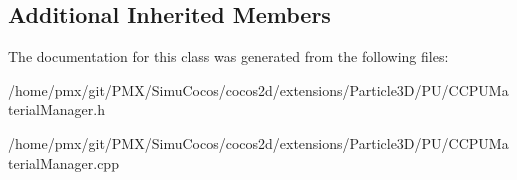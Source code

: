 \subsection*{Additional Inherited Members}


The documentation for this class was generated from the following files\+:\begin{DoxyCompactItemize}
\item 
/home/pmx/git/\+P\+M\+X/\+Simu\+Cocos/cocos2d/extensions/\+Particle3\+D/\+P\+U/C\+C\+P\+U\+Material\+Manager.\+h\item 
/home/pmx/git/\+P\+M\+X/\+Simu\+Cocos/cocos2d/extensions/\+Particle3\+D/\+P\+U/C\+C\+P\+U\+Material\+Manager.\+cpp\end{DoxyCompactItemize}
